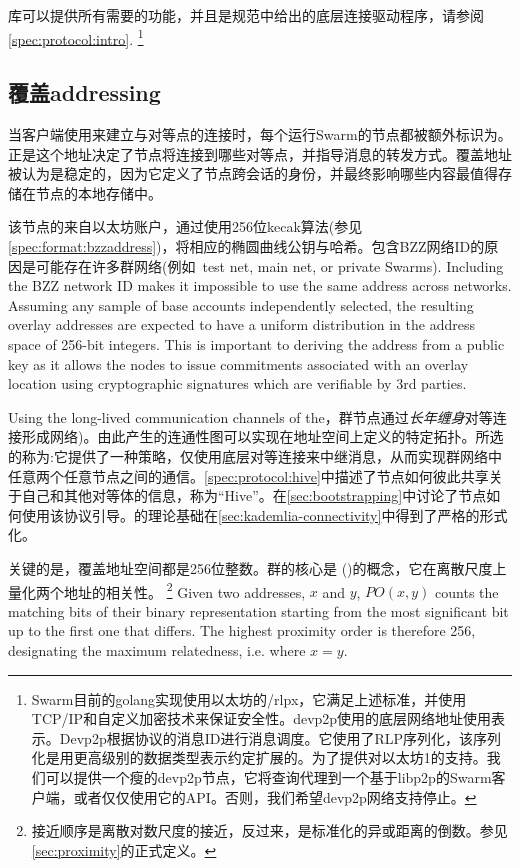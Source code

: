 库可以提供所有需要的功能，并且是规范中给出的底层连接驱动程序，请参阅\ref{spec:protocol:intro}.%
%
\footnote{Swarm目前的golang实现使用以太坊的/rlpx，它满足上述标准，并使用TCP/IP和自定义加密技术来保证安全性。devp2p使用的底层网络地址使用表示。Devp2p根据协议的消息ID进行消息调度。它使用了RLP序列化，该序列化是用更高级别的数据类型表示约定扩展的。为了提供对以太坊1的支持。我们可以提供一个瘦的devp2p节点，它将查询代理到一个基于libp2p的Swarm客户端，或者仅仅使用它的API。否则，我们希望devp2p网络支持停止。}

\subsection{覆盖addressing\statusgreen}\label{sec:overlay-addressing} 
\green{}

当客户端使用来建立与对等点的连接时，每个运行Swarm的节点都被额外标识为。正是这个地址决定了节点将连接到哪些对等点，并指导消息的转发方式。覆盖地址被认为是稳定的，因为它定义了节点跨会话的身份，并最终影响哪些内容最值得存储在节点的本地存储中。

该节点的来自以太坊账户，通过使用256位kecak算法(参见\ref{spec:format:bzzaddress})，将相应的椭圆曲线公钥与哈希。包含BZZ网络ID的原因是可能存在许多群网络(例如\ test net, main net, or private Swarms). Including the BZZ network ID makes it impossible to use the same address across networks. Assuming any sample of base accounts independently selected, the resulting overlay addresses are expected to have a uniform distribution in the address space of 256-bit integers. This is important to deriving the address from a public key as it allows the nodes to issue commitments associated with an overlay location using cryptographic signatures which are verifiable by 3rd parties. 

Using the long-lived communication channels of the，群节点通过\emph{长年缠身}对等连接形成网络)。由此产生的连通性图可以实现在地址空间上定义的特定拓扑。所选的称为:它提供了一种策略，仅使用底层对等连接来中继消息，从而实现群网络中任意两个任意节点之间的通信。\ref{spec:protocol:hive}中描述了节点如何彼此共享关于自己和其他对等体的信息，称为“Hive”。在\ref{sec:bootstrapping}中讨论了节点如何使用该协议引导。的理论基础在\ref{sec:kademlia-connectivity}中得到了严格的形式化。

关键的是，覆盖地址空间都是256位整数。群的核心是 ()的概念，它在离散尺度上量化两个地址的相关性。%
%
\footnote{接近顺序是离散对数尺度的接近，反过来，是标准化的异或距离的倒数。参见\ref{sec:proximity}的正式定义。}
%
Given two addresses, $x$ and $y$, $\mathit{PO}(x,y)$ counts the matching bits of their binary representation starting from the most significant bit up to the first one that differs. The highest proximity order is therefore 256, designating the maximum relatedness, i.e. where $x=y$.

